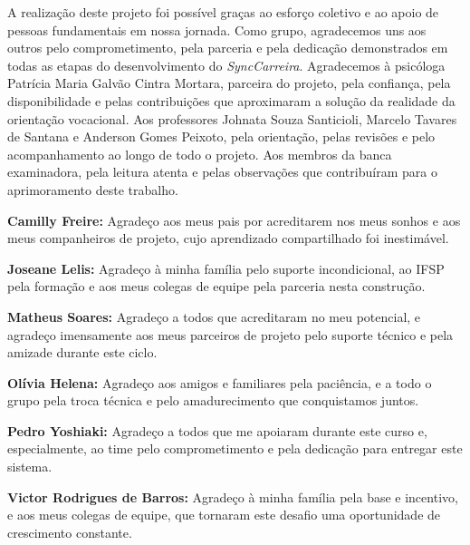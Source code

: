 \begin{agradecimentos}
A realização deste projeto foi possível graças ao esforço coletivo e ao apoio de pessoas fundamentais em nossa jornada. Como grupo, agradecemos uns aos outros pelo comprometimento, pela parceria e pela dedicação demonstrados em todas as etapas do desenvolvimento do \textit{SyncCarreira}. Agradecemos à psicóloga Patrícia Maria Galvão Cintra Mortara, parceira do projeto, pela confiança, pela disponibilidade e pelas contribuições que aproximaram a solução da realidade da orientação vocacional. Aos professores Johnata Souza Santicioli, Marcelo Tavares de Santana e Anderson Gomes Peixoto, pela orientação, pelas revisões e pelo acompanhamento ao longo de todo o projeto. Aos membros da banca examinadora, pela leitura atenta e pelas observações que contribuíram para o aprimoramento deste trabalho.

\vspace{0.5cm}
\noindent\textbf{Camilly Freire:} Agradeço aos meus pais por acreditarem nos meus sonhos e aos meus companheiros de projeto, cujo aprendizado compartilhado foi inestimável.

\vspace{0.5cm}
\noindent\textbf{Joseane Lelis:} Agradeço à minha família pelo suporte incondicional, ao IFSP pela formação e aos meus colegas de equipe pela parceria nesta construção.

\vspace{0.5cm}
\noindent\textbf{Matheus Soares:} Agradeço a todos que acreditaram no meu potencial, e agradeço imensamente aos meus parceiros de projeto pelo suporte técnico e pela amizade durante este ciclo.

\vspace{0.5cm}
\noindent\textbf{Olívia Helena:} Agradeço aos amigos e familiares pela paciência, e a todo o grupo pela troca técnica e pelo amadurecimento que conquistamos juntos.

\vspace{0.5cm}
\noindent\textbf{Pedro Yoshiaki:} Agradeço a todos que me apoiaram durante este curso e, especialmente, ao time pelo comprometimento e pela dedicação para entregar este sistema.

\vspace{0.5cm}
\noindent\textbf{Victor Rodrigues de Barros:} Agradeço à minha família pela base e incentivo, e aos meus colegas de equipe, que tornaram este desafio uma oportunidade de crescimento constante.
\end{agradecimentos}
